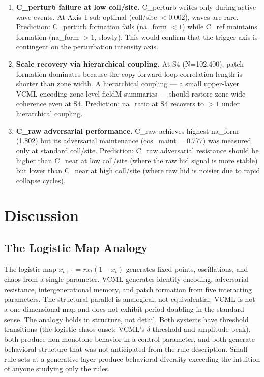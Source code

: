 \documentclass[11pt,a4paper]{article}
\begin{document}
\begin{enumerate}
  \item \textbf{C\_perturb failure at low coll/site.}
    C\_perturb writes only during active wave events.
    At Axis~I sub-optimal (coll/site $< 0.002$), waves are rare.
    Prediction: C\_perturb formation fails (na\_form $< 1$) while C\_ref
    maintains formation (na\_form $> 1$, slowly).
    This would confirm that the trigger axis is contingent on the perturbation
    intensity axis.

  \item \textbf{Scale recovery via hierarchical coupling.}
    At S4 (N=102,400), patch formation dominates because the copy-forward loop
    correlation length is shorter than zone width.
    A hierarchical coupling --- a small upper-layer VCML encoding zone-level
    fieldM summaries --- should restore zone-wide coherence even at S4.
    Prediction: na\_ratio at S4 recovers to $> 1$ under hierarchical coupling.

  \item \textbf{C\_raw adversarial performance.}
    C\_raw achieves highest na\_form (1.802) but its adversarial maintenance
    (cos\_maint = 0.777) was measured only at standard coll/site.
    Prediction: C\_raw adversarial resistance should be higher than C\_near at
    low coll/site (where the raw hid signal is more stable) but lower than
    C\_near at high coll/site (where raw hid is noisier due to rapid collapse
    cycles).
\end{enumerate}

\section{Discussion}

\subsection{The Logistic Map Analogy}

The logistic map $x_{t+1} = r x_t (1 - x_t)$ generates fixed points,
oscillations, and chaos from a single parameter.
VCML generates identity encoding, adversarial resistance, intergenerational
memory, and patch formation from five interacting parameters.
The structural parallel is analogical, not equivalential: VCML is not a
one-dimensional map and does not exhibit period-doubling in the standard sense.
The analogy holds in structure, not detail.
Both systems have threshold transitions (the logistic chaos onset; VCML's
$\delta$ threshold and amplitude peak), both produce non-monotone behavior
in a control parameter, and both generate behavioral structure that was not
anticipated from the rule description.
Small rule sets at a generative layer produce behavioral diversity exceeding
the intuition of anyone studying only the rules.
\end{document}
